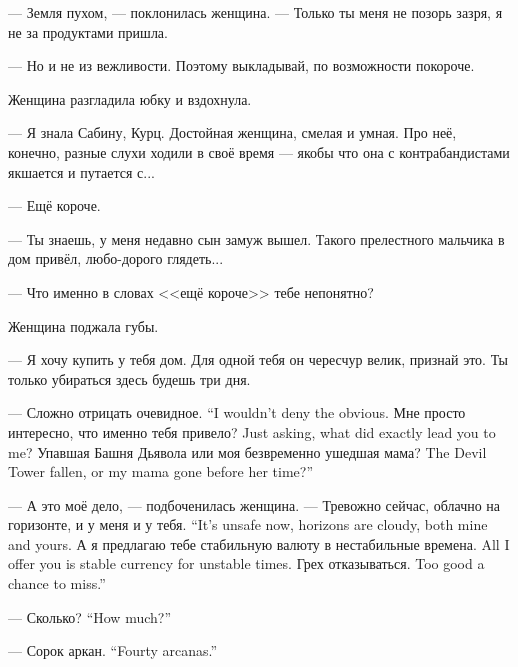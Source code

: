 --- Земля пухом, --- поклонилась женщина.
--- Только ты меня не позорь зазря, я не за продуктами пришла.

--- Но и не из вежливости.
Поэтому выкладывай, по возможности покороче.

Женщина разгладила юбку и вздохнула.

--- Я знала Сабину, Курц.
Достойная женщина, смелая и умная.
Про неё, конечно, разные слухи ходили в своё время --- якобы что она с контрабандистами якшается и путается с...

--- Ещё короче.

--- Ты знаешь, у меня недавно сын замуж вышел.
Такого прелестного мальчика в дом привёл, любо-дорого глядеть...

--- Что именно в словах <<ещё короче>> тебе непонятно?

Женщина поджала губы.

--- Я хочу купить у тебя дом.
Для одной тебя он чересчур велик, признай это.
Ты только убираться здесь будешь три дня.

{--- Сложно отрицать очевидное.}
{``I wouldn't deny the obvious.}
{Мне просто интересно, что именно тебя привело?}
{Just asking, what did exactly lead you to me?}
{Упавшая Башня Дьявола или моя безвременно ушедшая мама?}
{The Devil Tower fallen, or my mama gone before her time?''}

--- А это моё дело, --- подбоченилась женщина.
{--- Тревожно сейчас, облачно на горизонте, и у меня и у тебя.}
{``It's unsafe now, horizons are cloudy, both mine and yours.}
{А я предлагаю тебе стабильную валюту в нестабильные времена.}
{All I offer you is stable currency for unstable times.}
{Грех отказываться.}
{Too good a chance to miss.''}

{--- Сколько?}
{``How much?''}

{--- Сорок аркан\FM.}
{``Fourty arcanas\FM.''}

